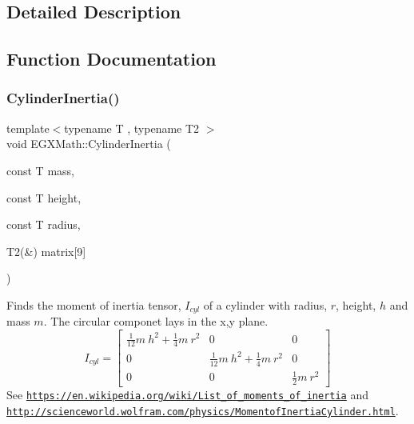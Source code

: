 \subsection{Detailed Description}


\subsection{Function Documentation}
\mbox{\label{group___e_g_x_math-_geometry-_cylinder_gae7dca080058b400feb0d69f78af7a850}} 
\subsubsection{\texorpdfstring{Cylinder\+Inertia()}{CylinderInertia()}\hspace{0.1cm}{\footnotesize\ttfamily [1/3]}}
{\footnotesize\ttfamily template$<$typename T , typename T2 $>$ \\
void E\+G\+X\+Math\+::\+Cylinder\+Inertia (\begin{DoxyParamCaption}\item[{const T}]{mass,  }\item[{const T}]{height,  }\item[{const T}]{radius,  }\item[{T2(\&)}]{matrix\mbox{[}9\mbox{]} }\end{DoxyParamCaption})}



Finds the moment of inertia tensor, $I_{cyl}$ of a cylinder with radius, $r$, height, $h$ and mass $m$. The circular componet lays in the x,y plane. \[ I_{cyl}=\begin{bmatrix} \frac{1}{12}m\ h^2 + \frac{1}{4}m\ r^2 & 0 & 0\\ 0 & \frac{1}{12}m\ h^2 + \frac{1}{4}m\ r^2 & 0\\ 0 & 0 & \frac{1}{2}m\ r^2 \end{bmatrix} \] See \href{https://en.wikipedia.org/wiki/List_of_moments_of_inertia}{\tt https\+://en.\+wikipedia.\+org/wiki/\+List\+\_\+of\+\_\+moments\+\_\+of\+\_\+inertia} and \href{http://scienceworld.wolfram.com/physics/MomentofInertiaCylinder.html}{\tt http\+://scienceworld.\+wolfram.\+com/physics/\+Momentof\+Inertia\+Cylinder.\+html}. 


